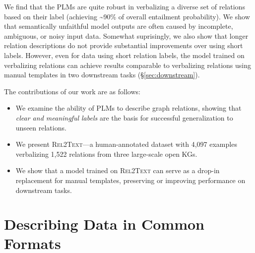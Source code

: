 We find that the PLMs are quite robust in verbalizing a diverse set of relations based on their label (achieving \textasciitilde 90\% of overall entailment probability). We show that semantically unfaithful model outputs are often caused by incomplete, ambiguous, or noisy input data. Somewhat suprisingly, we also show that longer relation descriptions do not provide substantial improvements over using short labels. However, even for data using short relation labels, the model trained on verbalizing relations can achieve results comparable to verbalizing relations using manual templates in two downstream tasks (§\ref{sec:downstream}).





The contributions of our work are as follows:
\begin{itemize}
    \item We examine the ability of PLMs to describe graph relations, showing that \textit{clear and meaningful labels} are the basis for successful generalization to unseen relations.
    \item We present \textsc{Rel2Text}---a human-annotated dataset with 4,097 examples verbalizing 1,522 relations from three large-scale open KGs.
    \item We show that a model trained on \textsc{Rel2Text} can serve as a drop-in replacement for manual templates, preserving or improving performance on downstream tasks.
\end{itemize}




\section{Describing Data in Common Formats}
\label{sec:quintd}